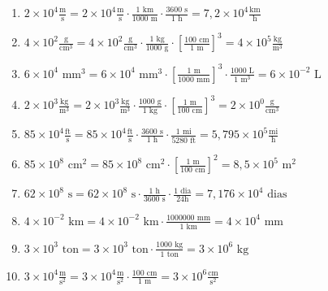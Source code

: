 \documentclass[letterpaper, 12pt, a4paper]{report}
\begin{document}
\begin{flushleft}
\begin{enumerate}
\begin{enumerate}
    \item $2\times 10^{4}\frac{\text{m}}{\text{s}} = 2\times 10^{4}\frac{\text{m}}{\text{s}}\cdot \frac{1\text{ km}}{1000\text{ m}}\cdot \frac{3600\text{ s}}{1\text{ h}} =7,2\times 10^{4}\frac{\text{km}}{\text{h}} $
    \item $4\times 10^{2} \frac{\text{g}}{\text{cm}^{3}} = 4\times 10^{2} \frac{\text{g}}{\text{cm}^{3}} \cdot \frac{1\text{ kg}}{1000\text{ g}}\cdot \left [\frac{100\text{ cm}}{1\text{ m}} \right ]^3 = 4\times 10^{5} \frac{\text{kg}}{\text{m}^{3}} $
    \item $6 \times 10^{4}\text{ mm}^{3} = 6 \times 10^{4}\text{ mm}^{3}\cdot \left[\frac{1\text{ m}}{1000\text{ mm}}\right]^3\cdot\frac{1000\text{ L}}{1\text{ m}^{3}}=6\times 10^{-2} \text{ L}$
    \item $2\times 10^{3} \frac{\text{kg}}{\text{m}^{3}}=2\times 10^{3} \frac{\text{kg}}{\text{m}^{3}}\cdot\frac{1000\text{ g}}{1\text{ kg}}\cdot\left [\frac{1\text{ m}}{100\text{ cm}}\right]^3=2\times10^0\frac{\text{g}}{\text{cm}^{3}}$ 
    \item $85\times 10^{4}\frac{\text{ft}}{\text{s}}=85\times 10^{4}\frac{\text{ft}}{\text{s}}\cdot \frac{3600\text{ s}}{1\text{ h}}\cdot \frac{1\text{ mi}}{5280\text{ ft}} =5,795\times 10^{5}\frac{\text{mi}}{\text{h}} $
    \item $85 \times 10^{8}\text{ cm}^{2}=85 \times 10^{8}\text{ cm}^{2}\cdot \left [ \frac{1\text{ m}}{100\text{ cm}} \right ]^2 = 8,5\times 10^{5}\text { m}^2$
    \item $62\times 10^{8} \text{ s}=62\times 10^{8} \text{ s}\cdot\frac{1\text{ h}}{3600\text{ s}}\cdot \frac{1\text{ dia}}{24\text{h}}=7,176\times10^{4} \text{ dias}$
    \item $4\times10^{-2}\text{ km}=4\times10^{-2}\text{ km}\cdot \frac{1000000\text{ mm}}{1\text{ km}}=4\times10^{4}\text{ mm}$
    \item $3\times10^{3}\text{ ton}=3\times10^{3}\text{ ton}\cdot \frac{1000\text{ kg}}{1\text{ ton}}=3\times10^{6}\text{ kg}$
    \item $3\times10^{4}\frac{\text{m}}{\text{s}^{2}}=3\times10^{4}\frac{\text{m}}{\text{s}^{2}}\cdot\frac{100\text{ cm}}{1\text{ m}}=3\times10^{6}\frac{\text{cm}}{\text{s}^2}$
\end{enumerate}
    \end{enumerate}
\end{flushleft}
\end{document}
